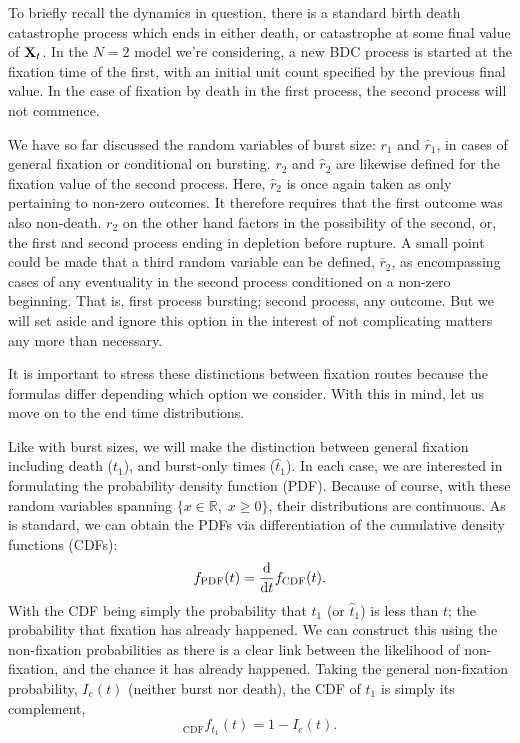 To briefly recall the dynamics in question, there is a standard birth death catastrophe process which ends in either death, or catastrophe at some final value of ${{\bf X}_t}$. In the $N=2$ model we're considering, a new BDC process is started at the fixation time of the first, with an initial unit count specified by the previous final value. In the case of fixation by death in the first process, the second process will not commence.\par
We have so far discussed the random variables of burst size: $r_1$ and $\hat r_1$, in cases of general fixation or conditional on bursting. $r_2$ and $\hat r_2$ are likewise defined for the fixation value of the second process. Here, $\hat r_2$ is once again taken as only pertaining to non-zero outcomes. It therefore requires that the first outcome was also non-death. $r_2$ on the other hand factors in the possibility of the second, or, the first and second process ending in depletion before rupture. A small point could be made that a third random variable can be defined, $\bar r_2$, as encompassing cases of any eventuality in the second process conditioned on a non-zero beginning. That is, first process bursting; second process, any outcome. But we will set aside and ignore this option in the interest of not complicating matters any more than necessary.\par 
It is important to stress these distinctions between fixation routes because the formulas differ depending which option we consider. With this in mind, let us move on to the end time distributions.\par
Like with burst sizes, we will make the distinction between general fixation including death ($t_1$), and burst-only times ($\hat t_1$). In each case, we are interested in formulating the probability density function (PDF). Because of course, with these random variables spanning $\{x\in \mathbb{R},\; x\geq 0\}$, their distributions are continuous. As is standard, we can obtain the PDFs via differentiation of the cumulative density functions (CDFs):
$$f_{\text{PDF}}(t) = \displaystyle\frac{{\rm d} }{{\rm d} t}{ f_{\text{CDF}}(t)}.$$
With the CDF being simply the probability that $t_1$ (or $\hat t_1$) is less than $t$; the probability that fixation has already happened. We can construct this using the non-fixation probabilities as there is a clear link between the likelihood of non-fixation, and the chance it has already happened. Taking the general non-fixation probability, $I_e(t)$ (neither burst nor death), the CDF of $t_1$ is simply its complement, 
$$_{\text{CDF}}f_{t_1}(t) = 1 - I_e(t).$$

